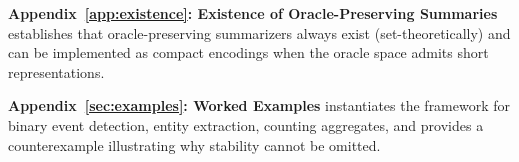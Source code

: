 \noindent\textbf{Appendix~\ref{app:existence}: Existence of Oracle-Preserving Summaries} establishes that oracle-preserving summarizers always exist (set-theoretically) and can be implemented as compact encodings when the oracle space admits short representations.

\noindent\textbf{Appendix~\ref{sec:examples}: Worked Examples} instantiates the framework for binary event detection, entity extraction, counting aggregates, and provides a counterexample illustrating why stability cannot be omitted.

\medskip












